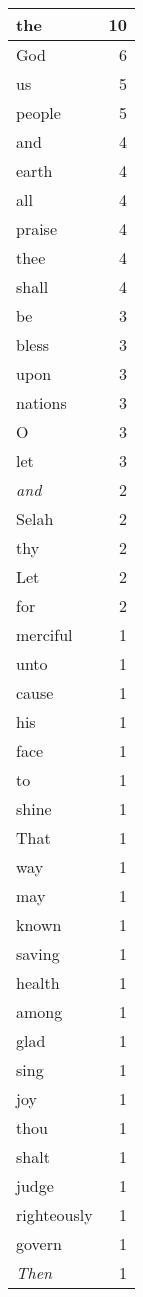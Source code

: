\begin{center}
\begin{longtable}{l|r}
\hline \hline
\endlastfoot
the & 10 \\ \hline
God & 6 \\ \hline
us & 5 \\ \hline
people & 5 \\ \hline
and & 4 \\ \hline
earth & 4 \\ \hline
all & 4 \\ \hline
praise & 4 \\ \hline
thee & 4 \\ \hline
shall & 4 \\ \hline
be & 3 \\ \hline
bless & 3 \\ \hline
upon & 3 \\ \hline
nations & 3 \\ \hline
O & 3 \\ \hline
let & 3 \\ \hline
\emph{and} & 2 \\ \hline
Selah & 2 \\ \hline
thy & 2 \\ \hline
Let & 2 \\ \hline
for & 2 \\ \hline
merciful & 1 \\ \hline
unto & 1 \\ \hline
cause & 1 \\ \hline
his & 1 \\ \hline
face & 1 \\ \hline
to & 1 \\ \hline
shine & 1 \\ \hline
That & 1 \\ \hline
way & 1 \\ \hline
may & 1 \\ \hline
known & 1 \\ \hline
saving & 1 \\ \hline
health & 1 \\ \hline
among & 1 \\ \hline
glad & 1 \\ \hline
sing & 1 \\ \hline
joy & 1 \\ \hline
thou & 1 \\ \hline
shalt & 1 \\ \hline
judge & 1 \\ \hline
righteously & 1 \\ \hline
govern & 1 \\ \hline
\emph{Then} & 1 \\ \hline

\end{longtable}
\end{center}
